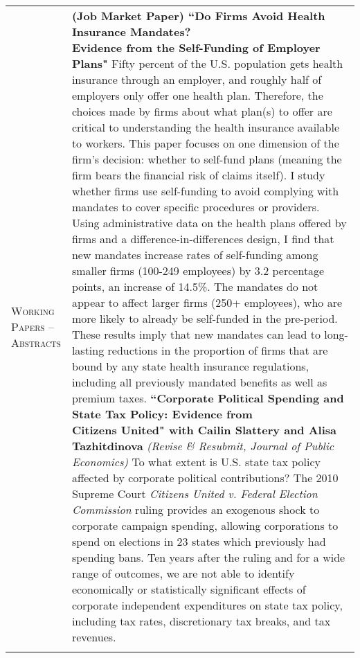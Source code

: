 \documentclass[11pt]{article}
\begin{document}
\begin{tabularx}{\textwidth}{@{}Y Z@{}}
	\textsc{Working \newline Papers -- \newline Abstracts}  & 
	\textbf{(Job Market Paper) ``Do Firms Avoid Health Insurance Mandates? \newline Evidence from the Self-Funding of Employer Plans"} \newline
	\vspace{-8pt} \newline
Fifty percent of the U.S. population gets health insurance through an employer, and roughly half of employers only offer one health plan. Therefore, the choices made by firms about what plan(s) to offer are critical to understanding the health insurance available to workers. This paper focuses on one dimension of the firm's decision: whether to self-fund plans (meaning the firm bears the financial risk of claims itself). I study whether firms use self-funding to avoid complying with mandates to cover specific procedures or providers. Using administrative data on the health plans offered by firms and a difference-in-differences design, I find that new mandates increase rates of self-funding among smaller firms (100-249 employees) by 3.2 percentage points, an increase of 14.5\%. The mandates do not appear to affect larger firms (250+ employees), who are more likely to already be self-funded in the pre-period. These results imply that new mandates can lead to long-lasting reductions in the proportion of firms that are bound by any state health insurance regulations, including all previously mandated benefits as well as premium taxes.  \href{https://www.s-robinson.com/Robinson_JMP.pdf}{\color{blue}{[Link to paper]}}
	\vspace{20pt} \newline
		\textbf{``Corporate Political Spending and State Tax Policy: Evidence from \newline  Citizens United" with Cailin Slattery and Alisa Tazhitdinova} \newline \textit{(Revise \& Resubmit, Journal of Public Economics)} \newline
	\vspace{-8pt} \newline
	To what extent is U.S. state tax policy affected by corporate political contributions? The 2010 Supreme Court \textit{Citizens United v. Federal Election Commission} ruling provides an exogenous shock to corporate campaign spending, allowing corporations to spend on elections in 23 states which previously had spending bans. Ten years after the ruling and for a wide range of outcomes, we are not able to identify economically or statistically significant effects of corporate independent expenditures on state tax policy, including tax rates, discretionary tax breaks, and tax revenues. \href{https://www.s-robinson.com/research/Slattery_Tazhitdinova_Robinson_Citizens_United.pdf}{\color{blue}{[Link to paper]}}
	\\
	\newpage
	

\end{tabularx}
\end{document}
